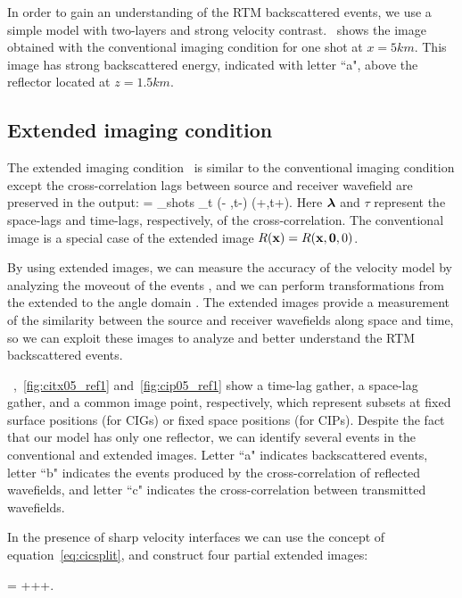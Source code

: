 In order to gain an understanding of the RTM backscattered events, we use a simple model with two-layers and strong velocity
contrast.~ shows the image obtained with the conventional imaging condition for one shot at $x=5km$. This image has strong 
backscattered energy, indicated with letter ``a", above the reflector located at $z=1.5km$.

\subsection{Extended imaging condition}

The extended imaging condition~\citep{rickett:883,sava:S209,GPR:GPR888} is similar to the conventional imaging condition
 except the cross-correlation lags between source and receiver wavefield are preserved in the output:
\beq
\Re= \sum_{shots} \sum_{t} \US(\xx - \hh,t-\tau) \UR(\xx+\hh,t+\tau).
\label{eq:eic}
\eeq
Here ${\boldsymbol{\lambda}}$ and $\tau$ represent the space-lags and time-lags, respectively, of the cross-correlation.
%
The conventional image is a special case of the extended image $R({\bf x})=R({\bf x},{\bf 0},0)$.

By using extended images, we can measure the accuracy of the velocity model by analyzing the moveout of the events
 \citep{yang:S151}, and we can perform transformations from the extended to the angle domain 
\citep{sava:1065,sava:S209,sava:S131}. The extended images provide a measurement of the similarity between the source
 and receiver wavefields along space and time, so we can exploit these images to analyze and better understand the RTM backscattered events.


~,~\ref{fig:citx05_ref1} and~\ref{fig:cip05_ref1} show a time-lag gather, a space-lag gather,
 and a common image point, respectively, which represent subsets at fixed surface positions (for CIGs) or fixed space positions 
(for CIPs). Despite the fact that our model has only one reflector, we can identify several events in the conventional and extended images. 
Letter ``a" indicates backscattered events, letter ``b" indicates the events produced by the cross-correlation of 
reflected wavefields, and letter ``c" indicates the cross-correlation between transmitted wavefields.

In the presence of sharp velocity interfaces we can use the concept of equation~\ref{eq:cicsplit}, and construct four partial 
extended images:

\beq
 \Re= +++.
\label{eq:eicsplit}
\eeq


